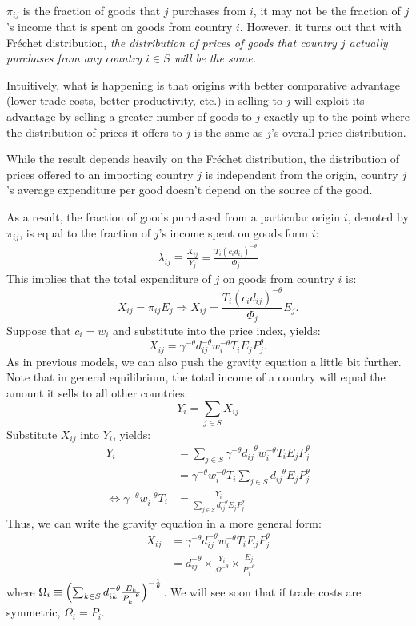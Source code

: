 \begin{note}
    \

    $\pi_{ij}$ is the fraction of goods that $j$ purchases from $i$, it may not be the fraction of $j$'s income that is spent on goods from country $i$.
    However, it turns out that with Fréchet distribution, \textit{the distribution of prices of goods that country $j$ actually
    purchases from any country $i \in S$ will be the same.}
\end{note}

Intuitively, what is happening is that origins with better comparative advantage (lower
trade costs, better productivity, etc.) in selling to $j$ will exploit its advantage by 
selling a greater number of goods to $j$ exactly up to the point where the distribution
of prices it offers to $j$ is the same as $j$'s overall price distribution.

While the result depends heavily on the Fréchet distribution, the distribution of prices offered 
to an importing country $j$ is independent from the origin, country $j$'s average expenditure per good
doesn't depend on the source of the good.

As a result, the fraction of goods purchased from a particular origin $i$, denoted by $\pi_{ij}$, 
is equal to the fraction of $j$'s income spent on goods form $i$:
\begin{gather}
    \lambda_{ij} \equiv \frac{X_{ij}}{Y_j} = \frac{T_i (c_i d_{ij})^{-\theta}}{\Phi_j} \label{eq:EKfraction}
\end{gather}
This implies that the total expenditure of $j$ on goods from country $i$ is:
\[X_{ij} = \pi_{ij} E_j \Rightarrow X_{ij} = \frac{T_i (c_i d_{ij})^{-\theta}}{\Phi_j} E_j.\]
Suppose that $c_i = w_i$ and substitute into the price index, yields:
\[
X_{ij} = \gamma^{-\theta} d_{ij}^{-\theta} w_i^{-\theta} T_i E_j P_j^{\theta}.
\]
As in previous models, we can also push the gravity equation a little bit further. Note
that in general equilibrium, the total income of a country will equal the amount it sells to
all other countries:
\[
Y_i = \sum_{j \in S} X_{ij} 
\]
Substitute $X_{ij}$ into $Y_i$, yields:
\begin{align*}
    Y_i &= \sum_{j \in S} \gamma^{-\theta} d_{ij}^{-\theta} w_i^{-\theta} T_i E_j P_j^{\theta} \\
    &= \gamma^{-\theta} w_i^{-\theta} T_i \sum_{j \in S} d_{ij}^{-\theta} E_j P_j^{\theta} \\
    \Leftrightarrow \gamma^{-\theta} w_i^{-\theta} T_i &= \frac{Y_i}{\sum_{j \in S} d_{ij}^{-\theta} E_j P_j^{\theta}}
\end{align*}
Thus, we can write the gravity equation in a more general form:
\begin{align*}
    X_{ij} &= \gamma^{-\theta} d_{ij}^{-\theta} w_i^{-\theta} T_i E_j P_j^{\theta} \\
    &= d_{ij}^{-\theta} \times \frac{Y_i}{\Omega^{-\theta}} \times \frac{E_j}{P_j^{-\theta}}
\end{align*}
where $\Omega_i \equiv \Bigl( \sum_{k \in S} d_{ik}^{-\theta} \frac{E_k}{P_k^{-\theta}}\Bigr)^{-\frac{1}{\theta}}$.
We will see soon that if trade costs are symmetric, $\Omega_i = P_i$.

